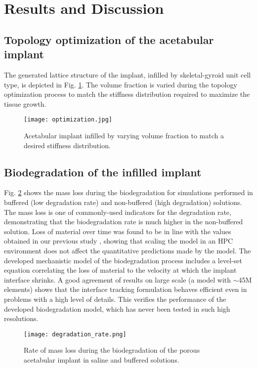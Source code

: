 \section{Results and Discussion}

\subsection{Topology optimization of the acetabular implant}

The generated lattice structure of the implant, infilled by skeletal-gyroid unit cell type, is depicted in Fig. \ref{fig:cup_optimization}. The volume fraction is varied during the topology optimization process to match the stiffness distribution required to maximize the tissue growth.

\begin{figure}[h]
\centering
\medskip
\texttt{[image: optimization.jpg]}
\caption[Infilled acetabular implant]{Acetabular implant infilled by varying volume fraction to match a desired stiffness distribution.} \label{fig:cup_optimization}
\end{figure}

\subsection{Biodegradation of the infilled implant}

Fig. \ref{fig:cup_degradation_rate} shows the mass loss during the biodegradation for simulations performed in buffered (low degradation rate) and non-buffered (high degradation) solutions. The mass loss is one of commonly-used indicators for the degradation rate, demonstrating that the biodegradation rate is much higher in the non-buffered solution. Loss of material over time was found to be in line with the values obtained in our previous study \cite{Barzegari2021}, showing that scaling the model in an HPC environment does not affect the quantitative predictions made by the model. The developed mechanistic model of the biodegradation process includes a level-set equation correlating the loss of material to the velocity at which the implant interface shrinks. A good agreement of results on large scale (a model with $\sim$45M elements) shows that the interface tracking formulation behaves efficient even in problems with a high level of details. This verifies the performance of the developed biodegradation model, which has never been tested in such high resolutions.

\begin{figure}[h]
\centering
\medskip
\texttt{[image: degradation\_rate.png]}
\caption[Biodegradation rate for the acetabular implant]{Rate of mass loss during the biodegradation of the porous acetabular implant in saline and buffered solutions.} \label{fig:cup_degradation_rate}
\end{figure}

